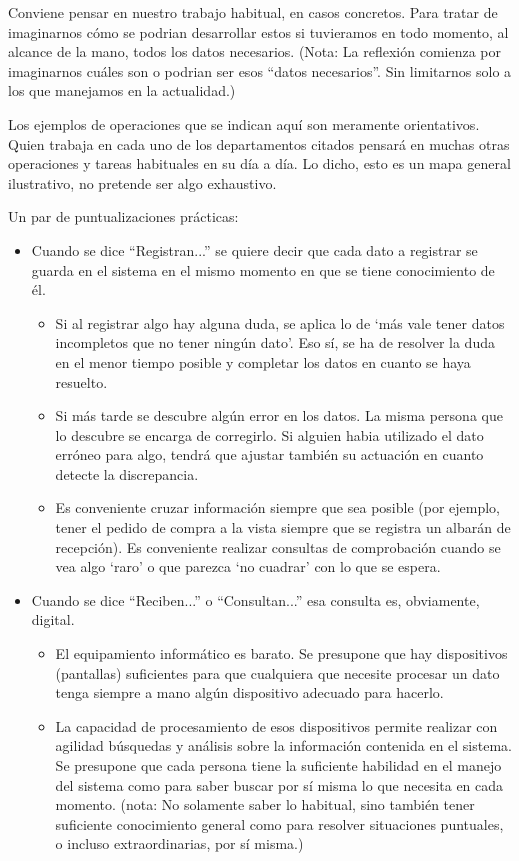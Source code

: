 \documentclass[spanish,12pt,a4paper,final,oneside]{book}
\begin{document}
Conviene pensar en nuestro trabajo habitual, en casos concretos. Para tratar de imaginarnos cómo se podrian desarrollar estos si tuvieramos en todo momento, al alcance de la mano, todos los datos necesarios. (Nota: La reflexión comienza por imaginarnos cuáles son o podrian ser esos ``datos necesarios''. Sin limitarnos solo a los que manejamos en la actualidad.)

Los ejemplos de operaciones que se indican aquí son meramente orientativos. Quien trabaja en cada uno de los departamentos citados pensará en muchas otras operaciones y tareas habituales en su día a día. Lo dicho, esto es un mapa general ilustrativo, no pretende ser algo exhaustivo.

Un par de puntualizaciones prácticas:
\begin{itemize}

\item Cuando se dice ``Registran...'' se quiere decir que cada dato a registrar se guarda en el sistema en el mismo momento en que se tiene conocimiento de él. 
\begin{itemize}
\item Si al registrar algo hay alguna duda, se aplica lo de ‘más vale tener datos incompletos que no tener ningún dato’. Eso sí, se ha de resolver la duda en el menor tiempo posible y completar los datos en cuanto se haya resuelto.
\item Si más tarde se descubre algún error en los datos. La misma persona que lo descubre se encarga de corregirlo. Si alguien habia utilizado el dato erróneo para algo, tendrá que ajustar también su actuación en cuanto detecte la discrepancia. 
\item Es conveniente cruzar información siempre que sea posible (por ejemplo, tener el pedido de compra a la vista siempre que se registra un albarán de recepción). Es conveniente realizar consultas de comprobación cuando se vea algo ‘raro’ o que parezca ‘no cuadrar’ con lo que se espera. 
\end{itemize}

\item Cuando se dice ``Reciben...'' o ``Consultan...'' esa consulta es, obviamente, digital. 
\begin{itemize}
\item El equipamiento informático es barato. Se presupone que hay dispositivos (pantallas) suficientes para que cualquiera que necesite procesar un dato tenga siempre a mano algún dispositivo adecuado para hacerlo.
\item La capacidad de procesamiento de esos dispositivos permite realizar con agilidad búsquedas y análisis sobre la información contenida en el sistema. Se presupone que cada persona tiene la suficiente habilidad en el manejo del sistema como para saber buscar por sí misma lo que necesita en cada momento. (nota: No solamente saber lo habitual, sino también tener suficiente conocimiento general como para resolver situaciones puntuales, o incluso extraordinarias, por sí misma.)
\end{itemize}

\end{itemize}
\end{document}

